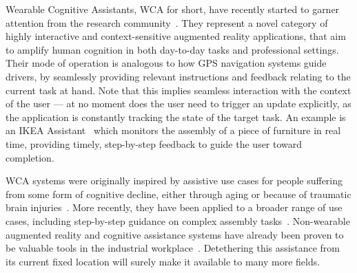 
Wearable Cognitive Assistants, WCA for short, have recently started to garner attention from the research community~\cite{Ha:TowardsWearableCogAssist,Chen:EarlyImplementation}.
They represent a novel category of highly interactive and context-sensitive augmented reality applications, that aim to amplify human cognition in both day-to-day tasks and professional settings.
Their mode of operation is analogous to how GPS navigation systems guide drivers, by seamlessly providing relevant instructions and feedback relating to the current task at hand.
Note that this implies seamless interaction with the context of the user --- at no moment does the user need to trigger an update explicitly, as the application is constantly tracking the state of the target task.
An example is an IKEA Assistant~\cite{IKEAAssistant} which monitors the assembly of a piece of furniture in real time, providing timely, step-by-step feedback to guide the user toward completion.

WCA systems were originally inspired by assistive use cases for people suffering from some form of cognitive decline, either through aging or because of traumatic brain injuries~\cite{Ha:TowardsWearableCogAssist,satya2019augmenting}.
More recently, they have been applied to a broader range of use cases, including step-by-step guidance on complex assembly tasks~\cite{Chen:AnEmpiricalStudyOfLatency}.
Non-wearable augmented reality and cognitive assistance systems have already been proven to be valuable tools in the industrial workplace~\cite{funk2015caworkplace,gorecky2011cognito}.
Detethering this assistance from its current fixed location will surely make it available to many more fields. 


